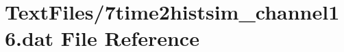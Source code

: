 \hypertarget{7time2histsim__channel16_8dat}{}\section{Text\+Files/7time2histsim\+\_\+channel16.dat File Reference}
\label{7time2histsim__channel16_8dat}
